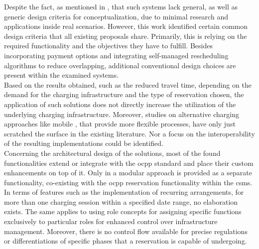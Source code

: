 \noindent Despite the fact, as mentioned in \cite{basmadjian_interoperable_2019}, that such systems lack general, as well as generic design criteria for conceptualization, due to minimal research and applications inside real scenarios.
However, this work identified certain common design criteria that all existing proposals share.
Primarily, this is relying on the required functionality and the objectives they have to fulfill.
Besides incorporating payment options and integrating self-managed rescheduling algorithms to reduce overlapping, additional conventional design choices are present within the examined systems. \\
\noindent Based on the results obtained, such as the reduced travel time, depending on the demand for the charging infrastructure and the type of reservation chosen, the application of such solutions does not directly increase the utilization of the underlying charging infrastructure.
Moreover, studies on alternative charging approaches like mobile , that provide more flexible processes, have only just scratched the surface in the existing literature. Nor a focus on the interoperability of the resulting implementations could be identified. \\
\noindent Concerning the architectural design of the solutions, most of the found functionalities extend or integrate with the \acrshort{ocpp} standard and place their custom enhancements on top of it. 
Only in \cite{flocea_electric_2022} a modular approach is provided as a separate functionality, co-existing with the \acrshort{ocpp} reservation functionality within the \acrshort{csms}.
In terms of features such as the implementation of recurring arrangements, for more than one charging session within a specified date range, no elaboration exists. 
The same applies to using role concepts for assigning specific functions exclusively to particular roles for enhanced control over infrastructure management.
Moreover, there is no control flow available for precise regulations or differentiations of specific phases that a reservation is capable of undergoing. 
